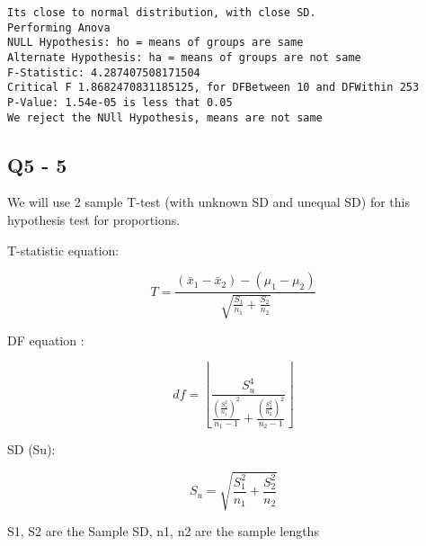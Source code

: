 \documentclass[11pt]{article}
\begin{document}
    \begin{Verbatim}[commandchars=\\\{\}]
Its close to normal distribution, with close SD.
Performing Anova
NULL Hypothesis: ho = means of groups are same
Alternate Hypothesis: ha = means of groups are not same
F-Statistic: 4.287407508171504
Critical F 1.8682470831185125, for DFBetween 10 and DFWithin 253
P-Value: 1.54e-05 is less that 0.05
We reject the NUll Hypothesis, means are not same

    \end{Verbatim}

    \subsection{Q5 - 5}\label{q5---5}

We will use 2 sample T-test (with unknown SD and unequal SD) for this
hypothesis test for proportions.

T-statistic equation:

\begin{equation*} T = \frac{(\bar x_1 - \bar x_2) - (\mu _1 - \mu _2)} {\sqrt {\frac {S_1}{n_1} + \frac {S_2} {n_2}}} \end{equation*}

DF equation :

\begin{equation*} df = \left \lfloor{\frac{S_u ^ 4} {\frac{( \frac{S_1 ^ 2}{n_1} )^2}{n_1 - 1} + {\frac{( \frac{S_2 ^ 2}{n_2} )^2}{n_2 - 1}}}} \right \rfloor\end{equation*}

SD (Su):

\begin{equation*} S_u = \sqrt{\frac{S_1 ^ 2}{n_1} + \frac{S_2 ^ 2}{n_2}}  \end{equation*}

S1, S2 are the Sample SD, n1, n2 are the sample lengths
\end{document}
